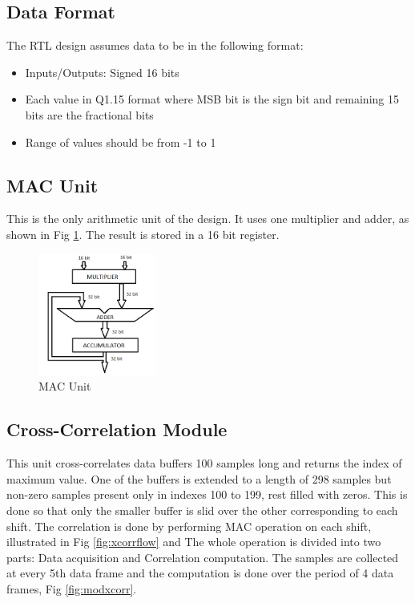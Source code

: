 \documentclass[conference]{IEEEtran}
\begin{document}
\subsection{Data Format}
The RTL design assumes data to be in the following format: 
\begin{itemize}
    \item Inputs/Outputs: Signed 16 bits 
    \item Each value in Q1.15 format where MSB bit is the sign bit and remaining 15 bits are the fractional bits
    \item Range of values should be from -1 to 1 
\end{itemize}

\subsection{MAC Unit}
This is the only arithmetic unit of the design. It uses one multiplier and adder, as shown in Fig \ref{fig:mac}. The result is stored in a 16 bit register. 

\begin{figure}
    \centering
    \includegraphics[height = 4cm]{mac.png}
    \caption{MAC Unit}
    \label{fig:mac}
\end{figure}
\subsection{Cross-Correlation Module}
This unit cross-correlates data buffers 100 samples long and returns the index of maximum value. One of the buffers is extended to a length of 298 samples but non-zero samples present only in indexes 100 to 199, rest filled with zeros. This is done so that only the smaller buffer is slid over the other corresponding to each shift. The correlation is done by performing MAC operation on each shift, illustrated in Fig \ref{fig:xcorrflow}  and The whole operation is divided into two parts: Data acquisition and Correlation computation. The samples are collected at every 5th data frame and the computation is done over the period of 4 data frames, Fig \ref{fig:modxcorr}. 
\end{document}
